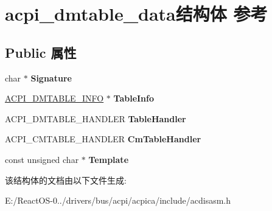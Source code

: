 \hypertarget{structacpi__dmtable__data}{}\section{acpi\+\_\+dmtable\+\_\+data结构体 参考}
\label{structacpi__dmtable__data}
\subsection*{Public 属性}
\begin{DoxyCompactItemize}
\item 
\mbox{\label{structacpi__dmtable__data_a27a2c7a6bec71820119c242c62ca8372}} 
char $\ast$ {\bfseries Signature}
\item 
\mbox{\label{structacpi__dmtable__data_a9b2a0b7f485fdb362c6302f622924a1e}} 
\hyperlink{structacpi__dmtable__info}{A\+C\+P\+I\+\_\+\+D\+M\+T\+A\+B\+L\+E\+\_\+\+I\+N\+FO} $\ast$ {\bfseries Table\+Info}
\item 
\mbox{\label{structacpi__dmtable__data_a4923d0236adb1296e3a21ca2d32eecac}} 
A\+C\+P\+I\+\_\+\+D\+M\+T\+A\+B\+L\+E\+\_\+\+H\+A\+N\+D\+L\+ER {\bfseries Table\+Handler}
\item 
\mbox{\label{structacpi__dmtable__data_a1f4a07fbc26660d2c1bd7095a701eb87}} 
A\+C\+P\+I\+\_\+\+C\+M\+T\+A\+B\+L\+E\+\_\+\+H\+A\+N\+D\+L\+ER {\bfseries Cm\+Table\+Handler}
\item 
\mbox{\label{structacpi__dmtable__data_a8c25a1a0d9680b6fb6ca5993ec92bd9e}} 
const unsigned char $\ast$ {\bfseries Template}
\end{DoxyCompactItemize}


该结构体的文档由以下文件生成\+:\begin{DoxyCompactItemize}
\item 
E\+:/\+React\+O\+S-\/0../drivers/bus/acpi/acpica/include/acdisasm.\+h\end{DoxyCompactItemize}
